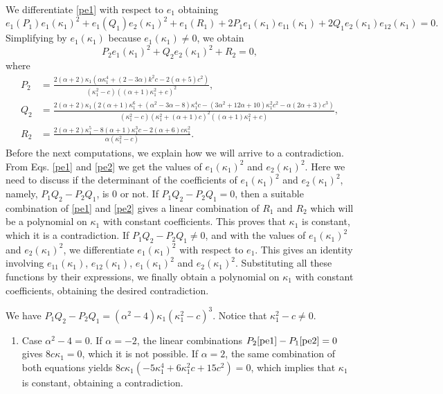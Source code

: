 \documentclass{birkjour}
\theoremstyle{definition}
\theoremstyle{remark}
\numberwithin{equation}{section}
\begin{document}
\begin{enumerate}
We differentiate \eqref{pe1} with respect to $e_1$ obtaining
$$e_1(P_1)e_1(\kappa_1)^2+e_1(Q_1)e_2(\kappa_1)^2+e_1(R_1)+2P_1e_1(\kappa_1)e_{11}(\kappa_1)+2Q_1 e_2(\kappa_1)e_{12}(\kappa_1)=0.$$
Simplifying by $e_1(\kappa_1)$ because $e_1(\kappa_1)\not=0$, we obtain 
\begin{equation}\label{pe2}
P_2e_1(\kappa_1)^2+Q_2e_2(\kappa_1)^2+R_2=0,
\end{equation}
 where 
\begin{equation*}
\begin{split}
P_2&= \frac{2 (\alpha +2) \kappa_1 \left(\alpha  \kappa_1^4+(2-3 \alpha ) k^2 c-2 (\alpha +5) c^2\right)}{\left(\kappa_1^2-c\right) \left((\alpha +1) \kappa_1^2+c\right)^2},\\
Q_2&= \frac{2 (\alpha +2) \kappa_1 \left(2 (\alpha +1) \kappa_1^6+\left(\alpha ^2-3 \alpha -8\right) \kappa_1^4 c-\left(3 \alpha ^2+12 \alpha +10\right) \kappa_1^2 c^2-\alpha  (2 \alpha +3) c^3\right)}{\left(\kappa_1^2-c\right) \left(\kappa_1^2+(\alpha+1)c\right)^2 \left((\alpha +1) \kappa_1^2+c\right)} ,\\
R_2&=\frac{2 (\alpha +2) \kappa_1^5-8 (\alpha +1) \kappa_1^3 c-2 (\alpha +6) c\kappa_1^2}{\alpha  \left(\kappa_1^2-c\right)} .
\end{split}
\end{equation*}
Before the next computations, we explain how we will arrive to a contradiction.  From Eqs. \eqref{pe1} and \eqref{pe2} we get   the values of $e_1(\kappa_1)^2$ and $e_2(\kappa_1)^2$. Here we   need to discuss if the determinant of the coefficients of $e_1(\kappa_1)^2$ and $e_2(\kappa_1)^2$, namely, $P_1Q_2-P_2Q_1$, is $0$ or not. If $P_1Q_2-P_2Q_1=0$, then a suitable combination of \eqref{pe1} and \eqref{pe2} gives a linear combination of $R_1$ and $R_2$ which will be a polynomial on $\kappa_1$ with constant coefficients. This proves that $\kappa_1$ is constant, which it is a contradiction. If  $P_1Q_2-P_2Q_1\not= 0$, and with the values of $e_1(\kappa_1)^2$ and $e_2(\kappa_1)^2$, we differentiate $e_1(\kappa_1)^2$ with respect to $e_1$. This gives an identity involving $e_{11}(\kappa_1)$, $e_{12}(\kappa_1)$, $e_1(\kappa_1)^2$ and $e_2(\kappa_1)^2$. Substituting all these functions by their  expressions, we finally obtain a polynomial on $\kappa_1$ with constant coefficients, obtaining the desired   contradiction. 

 We have $P_1Q_2-P_2Q_1=(\alpha^2 -4)   \kappa_1 \left(\kappa_1^2-c\right)^3$. Notice that $\kappa_1^2-c\not=0$.
\begin{enumerate}
\item Case $\alpha^2-4=0$.   If $\alpha=-2$, the linear combinations $P_2\eqref{pe1}-P_1 \eqref{pe2}=0$ gives $8c\kappa_1=0$, which it is not possible. If $\alpha=2$, the same  combination of both equations yields $8 c\kappa_1 \left(-5 \kappa_1^4+6 \kappa_1^2 c+15 c^2\right)=0$, which implies that $\kappa_1$ is constant, obtaining a contradiction. 
  

\end{enumerate}
\end{enumerate}
\end{document}
